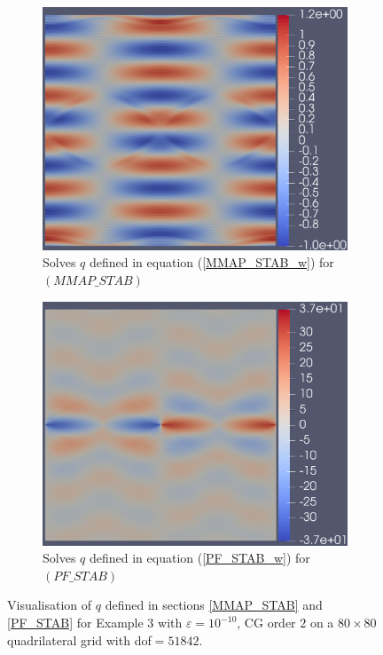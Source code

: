 \documentclass[12pt]{ociamthesis}
\begin{document}
\begin{figure}[H]
 \begin{subfigure}{0.5\textwidth}
     \includegraphics[width=\textwidth]{Pics/ErrorPlots/E3_MMAP_STAB_Q.png}
     \caption{Solves $q$ defined in equation (\ref{MMAP_STAB_w}) for $(MMAP\_STAB)$}
 \end{subfigure}
   \begin{subfigure}{0.5\textwidth}
     \includegraphics[width=\textwidth]{Pics/ErrorPlots/E3_PF_STAB_Q.png}
     \caption{Solves $q$ defined in equation (\ref{PF_STAB_w}) for $(PF\_STAB)$}
 \end{subfigure}
 \caption{Visualisation of $q$ defined in sections \ref{MMAP_STAB} and \ref{PF_STAB} for Example $3$ with $\varepsilon = 10^{-10}$, CG order $2$ on a $80 \times 80$ quadrilateral grid with dof$=51842$.} \label{E3_Q}
\end{figure}
\end{document}

